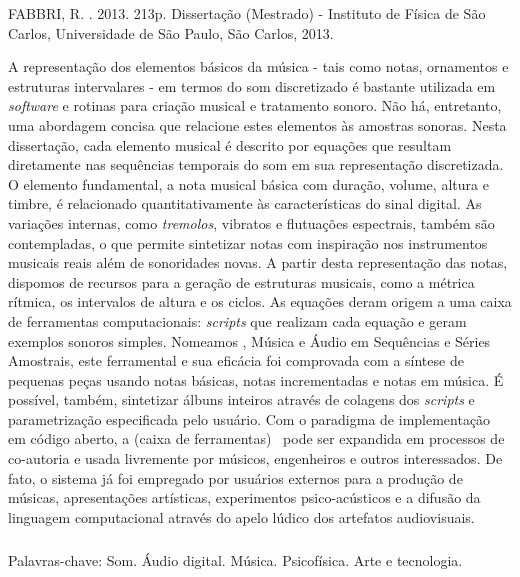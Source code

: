 \begin{resumo2}
\vspace{-10mm}
FABBRI, R. \textbf{\ABNTtitulodata}. 2013. 213p. Dissertação (Mestrado) - Instituto de Física de São Carlos, Universidade de São Paulo, São Carlos, 2013.
\vspace{15mm}

A representação dos elementos básicos da música - tais como notas, ornamentos e estruturas intervalares - em termos do som discretizado é bastante utilizada em \emph{software} e rotinas para criação musical e tratamento sonoro. Não há, entretanto, uma abordagem concisa que relacione estes elementos às amostras sonoras. Nesta dissertação, cada elemento musical é descrito por equações que resultam diretamente nas sequências temporais do som em sua representação discretizada. O elemento fundamental, a nota musical básica com duração, volume, altura e timbre, é relacionado quantitativamente às características do sinal digital. As variações internas, como \emph{tremolos}, vibratos e flutuações espectrais, também são contempladas, o que permite sintetizar notas com inspiração nos instrumentos musicais reais além de sonoridades novas. A partir desta representação das notas, dispomos de recursos para a geração de estruturas musicais, como a métrica rítmica, os intervalos de altura e os ciclos. As equações deram origem a uma caixa de ferramentas computacionais: \emph{scripts} que realizam cada equação e geram exemplos sonoros simples. Nomeamos \massa, Música e Áudio em Sequências e Séries Amostrais, este ferramental e sua eficácia foi comprovada com a síntese de pequenas peças usando notas básicas, notas incrementadas e notas em música. É possível, também, sintetizar álbuns inteiros através de colagens dos \emph{scripts} e parametrização especificada pelo usuário. Com o paradigma de implementação em código aberto, a (caixa de ferramentas) \massa\  pode ser expandida em processos de co-autoria e usada livremente por músicos, engenheiros e outros interessados. De fato, o sistema já foi empregado por usuários externos para a produção de músicas, apresentações artísticas, experimentos psico-acústicos e a difusão da linguagem computacional através do apelo lúdico dos artefatos audiovisuais.


$\phantom{linha em branco}$\\
Palavras-chave: Som. Áudio digital. Música. Psicofísica. Arte e tecnologia.

\end{resumo2}


\afterpage{\blankpage}

